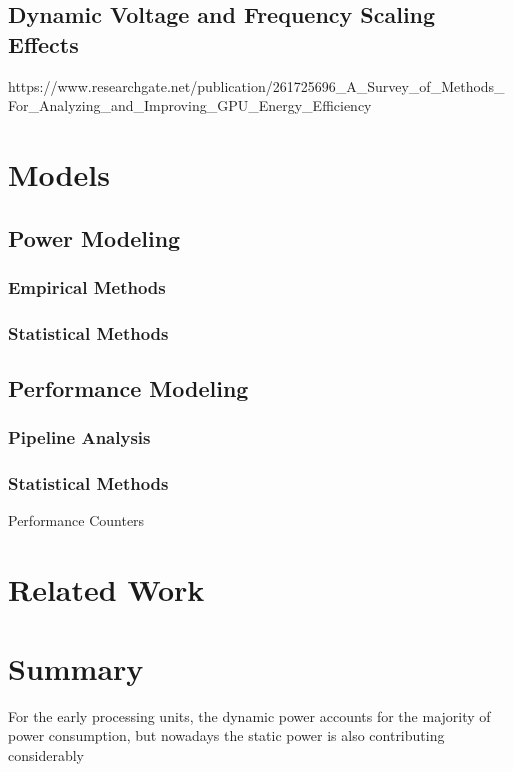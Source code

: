 

\subsection{Dynamic Voltage and Frequency Scaling Effects}
https://www.researchgate.net/publication/261725696_A_Survey_of_Methods_For_Analyzing_and_Improving_GPU_Energy_Efficiency




\section{Models}
\subsection{Power Modeling}
\label{section:powermodels}
\subsubsection{Empirical Methods}
\subsubsection{Statistical Methods}

\subsection{Performance Modeling}
\label{section:powermodels}
\subsubsection{Pipeline Analysis}
\subsubsection{Statistical Methods}
Performance Counters

\section{Related Work}

\section{Summary}


For the early processing units, the dynamic power accounts for the majority of power consumption, but nowadays the static power is also contributing considerably